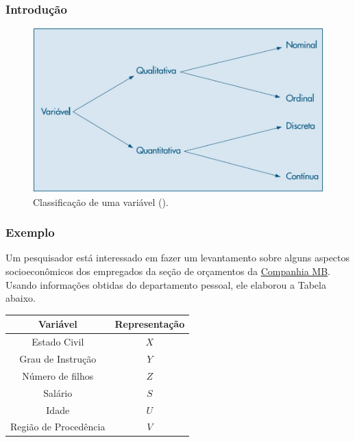 \documentclass[14pt,aspectratio=1610]{beamer}
\begin{document}
\begin{frame}{}
\frametitle{Introdução}
\begin{block}{}
\justifying
\begin{figure}[H]
    \centering
    \includegraphics[scale=0.5]{Fig2}
    \caption{Classificação de uma variável (\cite{Morettin09}).}
    \label{Fig2_ex}
  \end{figure}
\end{block}
\end{frame}

\begin{frame}{}
\frametitle{Exemplo}
\begin{block}{}
\justifying
Um pesquisador está interessado em fazer um levantamento sobre alguns
aspectos socioeconômicos dos empregados da seção de orçamentos da \href{run:E:/Documentos/GitHub/MAF105/maf105.github.io/Aulas_MAF105/Aula1}{Companhia MB}. Usando informações obtidas do departamento pessoal, ele elaborou a Tabela abaixo.
\begin{table}[H]
\label{tab1}
\begin{tabular}{c|c}
\hline
Variável             &Representação\\
\hline
Estado Civil         &$X$\\
Grau de Instrução    &$Y$\\
Número de filhos     &$Z$\\
Salário              &$S$\\
Idade                &$U$\\
Região de Procedência&$V$\\
\hline
\end{tabular}
\end{table}
\end{block}
\end{frame}
\end{document}
